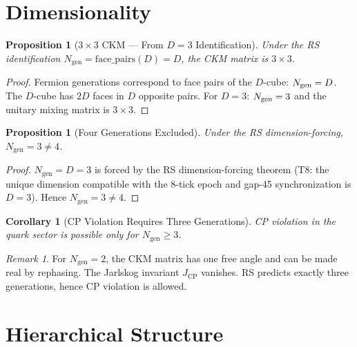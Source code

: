 \documentclass[12pt,a4paper]{article}
\newtheorem{corollary}[theorem]{Corollary}
\newtheorem{proposition}[theorem]{Proposition}
\theoremstyle{definition}
\theoremstyle{remark}
\newtheorem{remark}[theorem]{Remark}
\begin{document}
\section{Dimensionality}
\label{sec:dimensionality}

\begin{proposition}[$3 \times 3$ CKM --- From $D = 3$ Identification]
\label{thm:3x3}
Under the RS identification $N_\mathrm{gen} = \mathrm{face\_pairs}(D) = D$,
the CKM matrix is $3 \times 3$.
\end{proposition}

\begin{proof}
Fermion generations correspond to face pairs of the
$D$-cube: $N_{\rm gen} = D$.  The $D$-cube has $2D$ faces
in $D$ opposite pairs.  For $D = 3$: $N_{\rm gen} = 3$
and the unitary mixing matrix is $3 \times 3$.
\end{proof}

\begin{proposition}[Four Generations Excluded]
\label{thm:no4gen}
Under the RS dimension-forcing, $N_{\mathrm{gen}} = 3 \neq 4$.
\end{proposition}

\begin{proof}
$N_{\mathrm{gen}} = D = 3$ is forced by the RS dimension-forcing
theorem (T8: the unique dimension compatible with the 8-tick epoch and
gap-45 synchronization is $D = 3$).  Hence $N_{\mathrm{gen}} = 3 \neq 4$.
\end{proof}

\begin{corollary}[CP Violation Requires Three Generations]
\label{cor:cp3gen}
CP violation in the quark sector is possible only for
$N_{\mathrm{gen}} \geq 3$.
\end{corollary}

\begin{remark}
For $N_{\mathrm{gen}} = 2$, the CKM matrix has one free angle and
can be made real by rephasing.  The Jarlskog invariant $J_{\mathrm{CP}}$
vanishes.  RS predicts exactly three generations, hence CP violation
is allowed.
\end{remark}

\section{Hierarchical Structure}
\label{sec:hierarchy}
\end{document}
